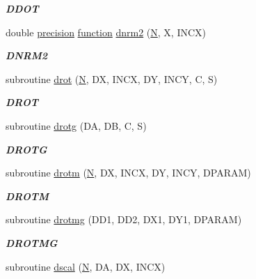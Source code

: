\begin{DoxyCompactItemize}
\begin{DoxyCompactList}\small\item\em {\bfseries D\+D\+O\+T} \end{DoxyCompactList}\item 
double \hyperlink{numinquire_8h_a2c8e616467665d0b2814d4c1589ba74e}{precision} \hyperlink{afunc_8m_a7b5e596df91eadea6c537c0825e894a7}{function} \hyperlink{group__double__blas__level1_ga4b25c539b862414e6f91ebb30b391d7c}{dnrm2} (\hyperlink{polmisc_8c_a0240ac851181b84ac374872dc5434ee4}{N}, X, I\+N\+C\+X)
\begin{DoxyCompactList}\small\item\em {\bfseries D\+N\+R\+M2} \end{DoxyCompactList}\item 
subroutine \hyperlink{group__double__blas__level1_ga54d516b6e0497df179c9831f2554b1f9}{drot} (\hyperlink{polmisc_8c_a0240ac851181b84ac374872dc5434ee4}{N}, D\+X, I\+N\+C\+X, D\+Y, I\+N\+C\+Y, C, S)
\begin{DoxyCompactList}\small\item\em {\bfseries D\+R\+O\+T} \end{DoxyCompactList}\item 
subroutine \hyperlink{group__double__blas__level1_gacb41f9f4a646322165fcc7313b9024bf}{drotg} (D\+A, D\+B, C, S)
\begin{DoxyCompactList}\small\item\em {\bfseries D\+R\+O\+T\+G} \end{DoxyCompactList}\item 
subroutine \hyperlink{group__double__blas__level1_ga0d579faa55a493933032c5dcddbe5f4f}{drotm} (\hyperlink{polmisc_8c_a0240ac851181b84ac374872dc5434ee4}{N}, D\+X, I\+N\+C\+X, D\+Y, I\+N\+C\+Y, D\+P\+A\+R\+A\+M)
\begin{DoxyCompactList}\small\item\em {\bfseries D\+R\+O\+T\+M} \end{DoxyCompactList}\item 
subroutine \hyperlink{group__double__blas__level1_ga13e351a3dfafa2cd8dc5302dcf53f69a}{drotmg} (D\+D1, D\+D2, D\+X1, D\+Y1, D\+P\+A\+R\+A\+M)
\begin{DoxyCompactList}\small\item\em {\bfseries D\+R\+O\+T\+M\+G} \end{DoxyCompactList}\item 
subroutine \hyperlink{group__double__blas__level1_ga793bdd0739bbd0e0ec8655a0df08981a}{dscal} (\hyperlink{polmisc_8c_a0240ac851181b84ac374872dc5434ee4}{N}, D\+A, D\+X, I\+N\+C\+X)

\end{DoxyCompactItemize}
